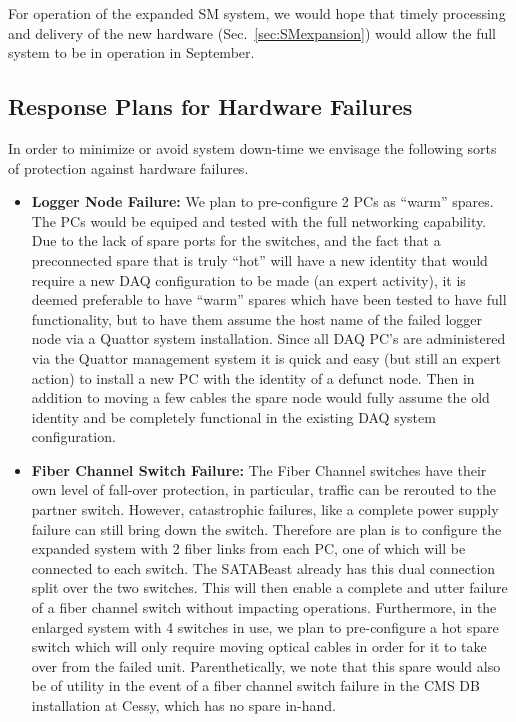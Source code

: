 For operation of the expanded SM system, we
would hope that timely processing and delivery of the new
hardware (Sec.~\ref{sec:SMexpansion}) would allow the full system 
to be in operation in September. 


\subsection{Response Plans for Hardware Failures \label{sec:SMhardfail}}

In order to minimize or avoid system down-time we envisage the following
sorts of protection against hardware failures.

\begin{itemize} 
\item {\bf Logger Node Failure:} We plan to pre-configure 2 PCs as ``warm'' spares.
The PCs would be equiped and tested with the full networking capability.
Due to the lack of spare ports for the switches, and the fact that
a preconnected spare that is truly ``hot'' will have a new identity
that would require a new DAQ configuration to be made (an expert activity),
it is deemed preferable to have ``warm'' spares which have been tested
to have full functionality, but to have them assume the host name of the
failed logger node via a Quattor system installation.
Since all DAQ PC's are administered via the Quattor management system
it is quick and easy (but still an expert action) to install a new PC with
the identity of a defunct node.
Then in addition to moving a few cables the spare node would fully assume
the old identity and be completely
functional in the existing DAQ system configuration. 

\item {\bf Fiber Channel Switch Failure:} The Fiber Channel switches have 
their own level of fall-over protection, in particular, traffic can
be rerouted to the partner switch.
However, catastrophic failures, like a complete power supply failure
can still bring down the switch.
Therefore are plan is to configure the expanded system with 2 fiber links
from each PC, one of which will be connected to each switch.
The SATABeast already has this dual connection split over the two switches.
This will then enable a complete and utter failure of a fiber channel
switch without impacting operations.
Furthermore, in the enlarged system with 4 switches in use, we plan to
pre-configure a hot spare switch which will only require moving optical
cables in order for it to take over from the failed unit.
Parenthetically, we note that this spare would also be of utility
in the event of a fiber channel switch failure in the CMS DB
installation at Cessy,  which has no spare in-hand.


\end{itemize}
